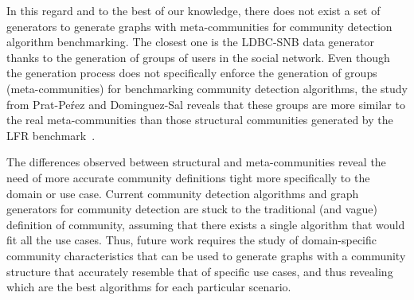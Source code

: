 In this regard and to the best of our knowledge, there does not exist a set of generators to generate graphs with meta-communities for community detection algorithm benchmarking. The closest one is the LDBC-SNB data generator~\cite{Erling:2015:LSN:2723372.2742786} thanks to the generation of groups of users in the social network. Even though the generation process does not specifically enforce the generation of groups (meta-communities) for benchmarking community detection algorithms, the study from Prat-Pe\'rez and Dominguez-Sal reveals that these groups are more similar to the real meta-communities than those structural communities generated by the LFR benchmark~\cite{Prat-Perez:2014:CSS:2621934.2621942}.

The differences observed between structural and meta-communities reveal the need of more accurate community definitions tight more specifically to the domain or use case. Current community detection algorithms and graph generators for community detection are stuck to the traditional (and vague) definition of community, assuming that there exists a single algorithm that would fit all the use cases. Thus, future work requires the study of domain-specific community characteristics that can be used to generate graphs with a community structure that accurately resemble that of specific use cases, and thus revealing which are the best algorithms for each particular scenario.

